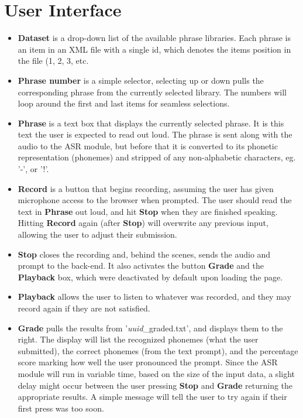 \documentclass[12pt, letterpaper]{article}
\begin{document}
\section*{User Interface}
\begin{itemize}
    \item \textbf{Dataset} is a drop-down list of the available phrase libraries. Each phrase is an item in an XML file with a single id, which denotes the items position in the file (1, 2, 3, etc.
    \item \textbf{Phrase number} is a simple selector, selecting up or down pulls the corresponding phrase from the currently selected library. The numbers will loop around the first and last items for seamless selections.
    \item \textbf{Phrase} is a text box that displays the currently selected phrase. It is this text the user is expected to read out loud. The phrase is sent along with the audio to the ASR module, but before that it is converted to its phonetic representation (phonemes) and stripped of any non-alphabetic characters, eg. '-', or '!'.
    \item \textbf{Record} is a button that begins recording, assuming the user has given microphone access to the browser when prompted. The user should read the text in \textbf{Phrase} out loud, and hit \textbf{Stop} when they are finished speaking. Hitting \textbf{Record} again (after \textbf{Stop}) will overwrite any previous input, allowing the user to adjust their submission.
    \item \textbf{Stop} closes the recording and, behind the scenes, sends the audio and prompt to the back-end. It also activates the button \textbf{Grade} and the \textbf{Playback} box, which were deactivated by default upon loading the page.
    \item \textbf{Playback} allows the user to listen to whatever was recorded, and they may record again if they are not satisfied. 
    \item \textbf{Grade} pulls the results from '\textit{uuid}\_graded.txt', and displays them to the right. The display will list the recognized phonemes (what the user submitted), the correct phonemes (from the text prompt), and the percentage score marking how well the user pronounced the prompt. Since the ASR module will run in variable time, based on the size of the input data, a slight delay might occur between the user pressing \textbf{Stop} and \textbf{Grade} returning the appropriate results. A simple message will tell the user to try again if their first press was too soon. 
\end{itemize}
\end{document}
